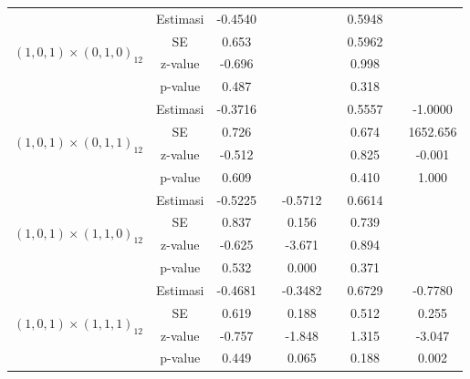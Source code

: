 \begin{enumerate}[label=\alph*.]
\begin{longtable}{|c|c|c|c|c|c|c|c|c|}
            \multirow{4}{*}{$(1,0,1)\times(0,1,0)_{12}$}
            & Estimasi & -0.4540  & {} & {} & {} & 0.5948 & {} & {}\\ \cline{2-9}
            & SE       & 0.653 & {} & {} & {} & 0.5962 & {} & {}\\ \cline{2-9}
            & z-value  & -0.696   & {} & {} & {} & 0.998 & {}& {}\\ \cline{2-9}
            & p-value  & 0.487 & {} & {} & {} & 0.318 & {} & {}\\ \hline

            \multirow{4}{*}{$(1,0,1)\times(0,1,1)_{12}$}
            & Estimasi & -0.3716  & {} & {} & {} & 0.5557 & {} & -1.0000\\ \cline{2-9}
            & SE       & 0.726 & {} & {} & {} & 0.674 & {} & 1652.656\\ \cline{2-9}
            & z-value  & -0.512  & {} & {} & {} & 0.825 & {}& -0.001\\ \cline{2-9}
            & p-value  & 0.609 & {} & {} & {} & 0.410 & {} & 1.000\\ \hline

            \multirow{4}{*}{$(1,0,1)\times(1,1,0)_{12}$}
            & Estimasi & -0.5225  & {} & -0.5712 & {} & 0.6614 & {} & {}\\ \cline{2-9}
            & SE       & 0.837 & {} & 0.156 & {} & 0.739 & {} & {}\\ \cline{2-9}
            & z-value  & -0.625  & {} & -3.671 & {} & 0.894 & {}& {}\\ \cline{2-9}
            & p-value  & 0.532 & {} & 0.000 & {} & 0.371 & {} & {}\\ \hline

            \multirow{4}{*}{$(1,0,1)\times(1,1,1)_{12}$}
            & Estimasi & -0.4681  & {} & -0.3482 & {} & 0.6729 & {} & -0.7780\\ \cline{2-9}
            & SE       & 0.619 & {} & 0.188 & {} & 0.512 & {} & 0.255\\ \cline{2-9}
            & z-value  & -0.757 & {} & -1.848 & {} & 1.315 & {}& -3.047\\ \cline{2-9}
            & p-value  & 0.449 & {} & 0.065 & {} & 0.188 & {} & 0.002\\ \hline


\end{longtable}
\end{enumerate}
